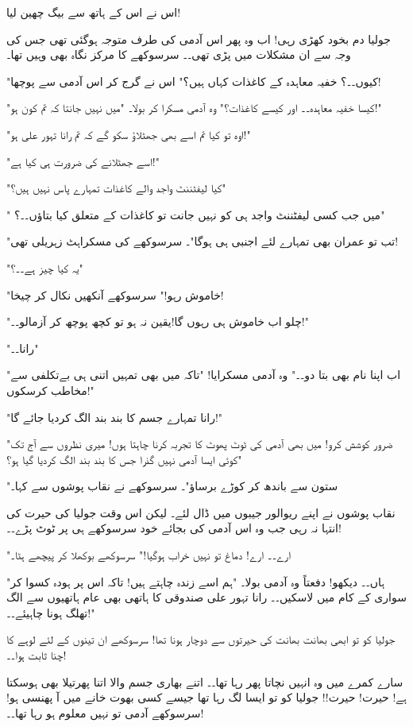 اس نے اس کے ہاتھ سے بیگ چھین لیا!

جولیا دم بخود کھڑی رہی! اب وہ پھر اس آدمی کی طرف متوجہ ہوگئی تھی جس کی وجہ سے ان مشکلات میں پڑی تھی۔۔ 
سرسوکھے کا مرکز نگاہ بھی وہیں تھا۔

"کیوں۔۔؟ خفیہ معاہدہ کے کاغذات کہاں ہیں؟" اس نے گرج کر اس آدمی سے پوچھا!

"کیسا خفیہ معاہدہ۔۔ اور کیسے کاغذات؟" وہ آدمی مسکرا کر بولا۔ "میں نہیں جانتا کہ تم کون ہو!"

"اوہ تو کیا تم اسے بھی جھٹلاؤ سکو گے کہ تم رانا تہور علی ہو!"

"اسے جھٹلانے کی ضرورت ہی کیا ہے!"

"کیا لیفٹننٹ واجد والے کاغذات تمہارے پاس نہیں ہیں؟"

" میں جب کسی لیفٹننٹ واجد ہی کو نہیں جانت تو کاغذات کے متعلق کیا بتاؤں۔۔؟"

"تب تو عمران بھی تمہارے لئے اجنبی ہی ہوگا"۔ سرسوکھے کی مسکراہٹ زہریلی تھی!

"یہ کیا چیز ہے۔۔؟"

"خاموش رہو!" سرسوکھے آنکھیں نکال کر چیخا!

"چلو اب خاموش ہی رہوں گا!یقین نہ ہو تو کچھ پوچھ کر آزمالو۔۔!"

"رانا۔۔"

"اب اپنا نام بھی بتا دو۔۔" وہ آدمی مسکرایا! "تاکہ میں بھی تمہیں اتنی ہی بےتکلفی سے مخاطب کرسکوں!"

"رانا تمہارے جسم کا بند بند الگ کردیا جائے گا!"

"ضرور کوشش کرو! میں بھی آدمی کی ٹوٹ پھوٹ کا تجربہ کرنا چاہتا ہوں! میری نظروں سے آج تک کوئی ایسا آدمی نہیں گذرا جس کا بند بند الگ کردیا گیا ہو؟"

"ستون سے باندھ کر کوڑے برساؤ"۔ سرسوکھے نے نقاب پوشوں سے کہا۔

نقاب پوشوں نے اپنے ریوالور جیبوں میں ڈال لئے۔ لیکن اس وقت جولیا کی حیرت کی انتہا نہ رہی جب وہ اس آدمی کی بجائے خود سرسوکھے ہی پر ٹوٹ پڑے۔۔!

"ارے۔۔ ارے! دماغ تو نہیں خراب ہوگیا!" سرسوکھے بوکھلا کر پیچھے ہٹا۔

"ہاں۔۔ دیکھو! دفعتاً وہ آدمی بولا۔ "ہم اسے زندہ چاہتے ہیں! تاکہ اس پر ہودہ کسوا کر سواری کے کام میں لاسکیں۔۔ رانا تہور علی صندوقی کا ہاتھی بھی عام ہاتھیوں سے الگ تھلگ ہونا چاہیئے۔۔!"

جولیا کو تو ابھی بھانت بھانت کی حیرتوں سے دوچار ہونا تھا! سرسوکھے ان تینوں کے لئے لوہے کا چنا ثابت ہوا۔۔!

سارے کمرے میں وہ انہیں نچاتا پھر رہا تھا۔۔ اتنے بھاری جسم والا اتنا پھرتیلا بھی ہوسکتا ہے! حیرت! حیرت!! جولیا کو تو ایسا لگ رہا تھا جیسے کسی بھوت خانے میں آ پھنسی ہو! سرسوکھے آدمی تو نہیں معلوم ہو رہا تھا۔۔!

